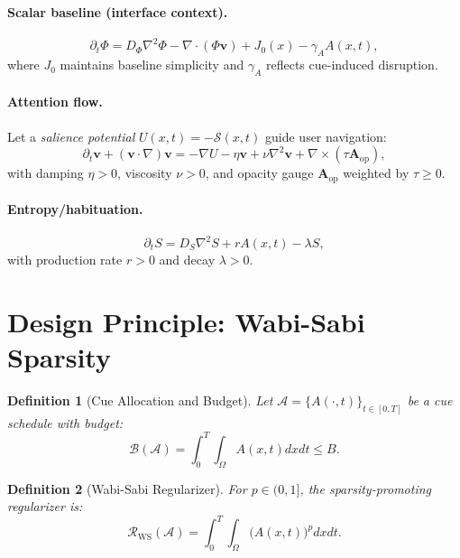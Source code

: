 \documentclass[openany]{book}
\newtheorem{definition}{Definition}[chapter]
\newcommand{\PhiS}{\Phi} %
\newcommand{\vvec}{\mathbf{v}} %
\newcommand{\Sent}{S} %
\begin{document}
\paragraph{Scalar baseline (interface context).}
\begin{equation}
\label{eq:phi}
\partial_t \PhiS = D_\Phi \nabla^2 \PhiS - \nabla \cdot (\PhiS \vvec) + J_0(x) - \gamma_A A(x,t),
\end{equation}
where $J_0$ maintains baseline simplicity and $\gamma_A$ reflects cue-induced disruption.
\paragraph{Attention flow.}
Let a \emph{salience potential} $U(x,t) = -\mathcal{S}(x,t)$ guide user navigation:
\begin{equation}
\label{eq:v}
\partial_t \vvec + (\vvec \cdot \nabla)\vvec = -\nabla U - \eta \vvec + \nu \nabla^2 \vvec + \nabla \times (\tau \mathbf{A}_{\mathrm{op}}),
\end{equation}
with damping $\eta > 0$, viscosity $\nu > 0$, and opacity gauge $\mathbf{A}_{\mathrm{op}}$ weighted by $\tau \geq 0$.
\paragraph{Entropy/habituation.}
\begin{equation}
\label{eq:S}
\partial_t \Sent = D_S \nabla^2 \Sent + r A(x,t) - \lambda \Sent,
\end{equation}
with production rate $r > 0$ and decay $\lambda > 0$.

\section{Design Principle: Wabi-Sabi Sparsity}
\label{sec:rsvp-wabisabi}
\begin{definition}[Cue Allocation and Budget]
\label{def:budget}
Let $\mathcal{A} = \{A(\cdot,t)\}_{t \in [0,T]}$ be a cue schedule with budget:
\begin{equation}
\label{eq:budget}
\mathcal{B}(\mathcal{A}) = \int_{0}^{T} \int_{\Omega} A(x,t) dx dt \leq B.
\end{equation}
\end{definition}

\begin{definition}[Wabi-Sabi Regularizer]
\label{def:ws}
For $p \in (0,1]$, the sparsity-promoting regularizer is:
\begin{equation}
\label{eq:ws-reg}
\mathcal{R}_{\mathrm{WS}}(\mathcal{A}) = \int_{0}^{T} \int_{\Omega} \big(A(x,t)\big)^p dx dt.
\end{equation}
\end{definition}
\end{document}
